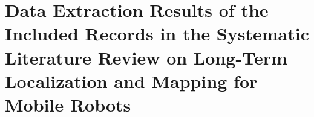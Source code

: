 \section{Data Extraction Results of the Included Records in the Systematic Literature Review on Long-Term Localization and Mapping for Mobile Robots}
\label{a2:data-extraction}

